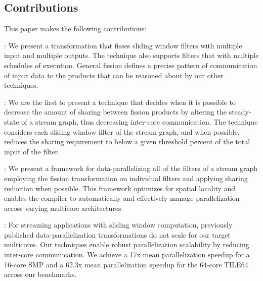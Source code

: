\subsection{Contributions}
This paper makes the following contributions:
\begin{itemize}

  : We present a
  transformation that fisses sliding window filters with multiple
  input and multiple outputs.  The technique also supports filters
  that with multiple schedules of execution.  General fission defines
  a precise pattern of communication of input data to the products
  that can be reasoned about by our other techniques.

  : We are the first to present a technique
  that decides when it is possible to decrease the amount of sharing
  between fission products by altering the steady-state of a stream
  graph, thus decreasing inter-core communication.  The technique
  considers each sliding window filter of the stream graph,
  and when possible, reduces the sharing requirement to below a given
  threshold percent of the total input of the filter. 

  : We present a
  framework for data-parallelizing all of the filters of a stream
  graph employing the fission transformation on individual filters and
  applying sharing reduction when possible.  This framework optimizes
  for spatial locality and enables the compiler to automatically and
  effectively manage parallelization across varying multicore
  architectures.

  : For
  streaming applications with sliding window computation, previously
  published data-parallelization transformations do not scale for our
  target multicores. Our techniques enable robust parallelization
  scalability by reducing inter-core communication.  We achieve a 17x
  mean parallelization speedup for a 16-core SMP and a 62.3x mean
  parallelization speedup for the 64-core TILE64 across our benchmarks.

\end{itemize}

